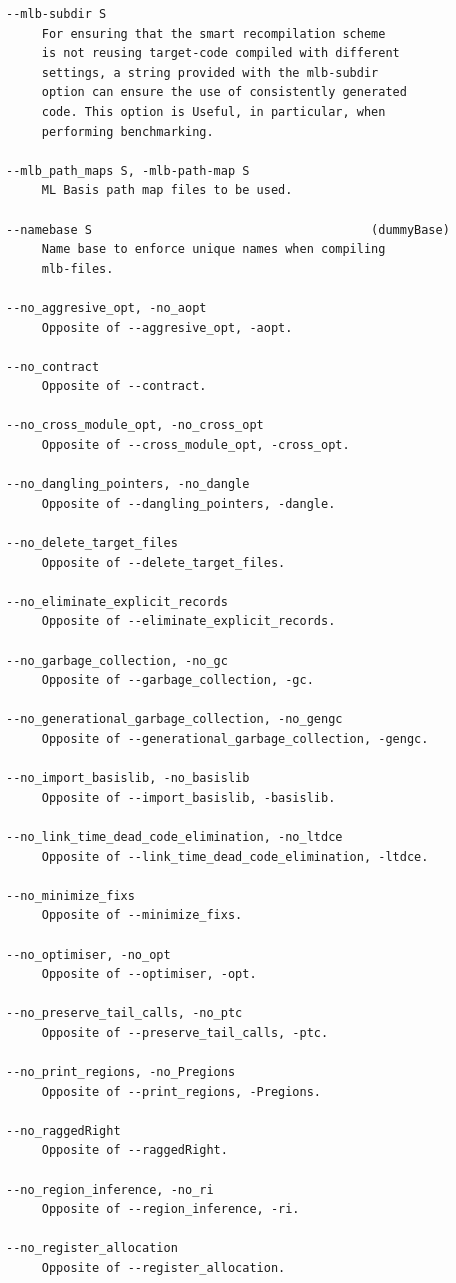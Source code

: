 \documentclass[12pt]{book}
\begin{document}
\begin{verbatim}
--mlb-subdir S
     For ensuring that the smart recompilation scheme
     is not reusing target-code compiled with different
     settings, a string provided with the mlb-subdir
     option can ensure the use of consistently generated
     code. This option is Useful, in particular, when
     performing benchmarking.

--mlb_path_maps S, -mlb-path-map S
     ML Basis path map files to be used.

--namebase S                                       (dummyBase)
     Name base to enforce unique names when compiling
     mlb-files.

--no_aggresive_opt, -no_aopt
     Opposite of --aggresive_opt, -aopt.

--no_contract
     Opposite of --contract.

--no_cross_module_opt, -no_cross_opt
     Opposite of --cross_module_opt, -cross_opt.

--no_dangling_pointers, -no_dangle
     Opposite of --dangling_pointers, -dangle.

--no_delete_target_files
     Opposite of --delete_target_files.

--no_eliminate_explicit_records
     Opposite of --eliminate_explicit_records.

--no_garbage_collection, -no_gc
     Opposite of --garbage_collection, -gc.

--no_generational_garbage_collection, -no_gengc
     Opposite of --generational_garbage_collection, -gengc.

--no_import_basislib, -no_basislib
     Opposite of --import_basislib, -basislib.

--no_link_time_dead_code_elimination, -no_ltdce
     Opposite of --link_time_dead_code_elimination, -ltdce.

--no_minimize_fixs
     Opposite of --minimize_fixs.

--no_optimiser, -no_opt
     Opposite of --optimiser, -opt.

--no_preserve_tail_calls, -no_ptc
     Opposite of --preserve_tail_calls, -ptc.

--no_print_regions, -no_Pregions
     Opposite of --print_regions, -Pregions.

--no_raggedRight
     Opposite of --raggedRight.

--no_region_inference, -no_ri
     Opposite of --region_inference, -ri.

--no_register_allocation
     Opposite of --register_allocation.


\end{verbatim}
\end{document}
